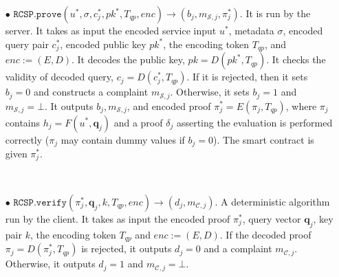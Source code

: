 \begin{definition}[RC-S-P Scheme]
\begin{itemize}

\

\item[$\bullet$] $\mathtt{RCSP}.\mathtt{prove}(u^{\scriptscriptstyle *},  \sigma,  c^{\scriptscriptstyle *}_{\scriptscriptstyle j},pk^{\scriptscriptstyle *}, T_{\scriptscriptstyle qp},enc)\rightarrow (b_{\scriptscriptstyle j},m_{\scriptscriptstyle \mathcal{S},j},\pi^{\scriptscriptstyle *}_{\scriptscriptstyle j})$. It is run by the server. It  takes as input the encoded service input $u^{\scriptscriptstyle *}$, metadata $\sigma$,   encoded query pair $c^{\scriptscriptstyle *}_{\scriptscriptstyle j}$, encoded public key $pk^{\scriptscriptstyle *}$,    the encoding token $T_{\scriptscriptstyle qp}$, and $enc:=(E,D)$.  It decodes the public key, $pk=D(pk^{\scriptscriptstyle *}, T_{\scriptscriptstyle qp})$. It checks the validity of decoded query, $c_{\scriptscriptstyle j}=D(c^{\scriptscriptstyle *}_{\scriptscriptstyle j},T_{\scriptscriptstyle qp})$.  If it is rejected, then it sets $b_{\scriptscriptstyle j}=0$ and constructs a complaint $m_{\scriptscriptstyle \mathcal{S},j}$. Otherwise,  it   sets $b_{\scriptscriptstyle j}=1$ and $m_{\scriptscriptstyle \mathcal{S},j}=\bot$. It outputs $b_{\scriptscriptstyle j},m_{\scriptscriptstyle \mathcal{S},j}$,   and  encoded proof $\pi^{\scriptscriptstyle *}_{\scriptscriptstyle j}=E(\pi_{\scriptscriptstyle j},T_{\scriptscriptstyle qp})$, where  $\pi_{\scriptscriptstyle j}$ contains $h_{\scriptscriptstyle j}=F(u^{\scriptscriptstyle *},\bm{q}_{\scriptscriptstyle j})$ and a proof $\delta_{\scriptscriptstyle j}$  asserting the evaluation is performed correctly ($\pi_{\scriptscriptstyle j}$ may contain dummy values if $b_{\scriptscriptstyle j}=0$). The smart contract is given $\pi^{\scriptscriptstyle *}_{\scriptscriptstyle j}$.



\

\item[$\bullet$] $\mathtt{RCSP}.\mathtt{verify}(\pi^{\scriptscriptstyle *}_{\scriptscriptstyle j}, \bm{q}_{\scriptscriptstyle j},k,T_{\scriptscriptstyle qp},enc)\rightarrow (d_{\scriptscriptstyle j},m_{\scriptscriptstyle \mathcal{C},j})$. A deterministic algorithm run by the client. It takes as input the encoded proof $\pi^{\scriptscriptstyle *}_{\scriptscriptstyle j}$,  query vector $\bm{q}_{\scriptscriptstyle j}$, key pair $k$,  the encoding token $T_{\scriptscriptstyle qp}$ and $enc:=(E,D)$. If the decoded proof $\pi_{\scriptscriptstyle j}=D(\pi^{\scriptscriptstyle *}_{\scriptscriptstyle j},T_{\scriptscriptstyle qp})$ is rejected,  it outputs $d_{\scriptscriptstyle j}=0$ and a complaint $m_{\scriptscriptstyle \mathcal{C},j}$. Otherwise, it outputs  $d_{\scriptscriptstyle j}=1$ and $m_{\scriptscriptstyle \mathcal{C},j}=\bot$.





\end{itemize}
\end{definition}
